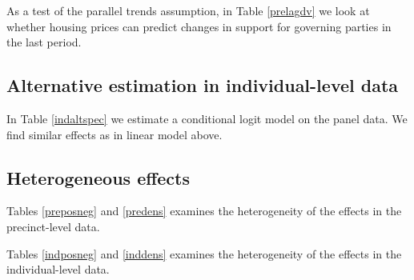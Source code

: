 \documentclass[12pt,a4paper]{article}
\begin{document}
	As a test of the parallel trends assumption, in Table \ref{prelagdv} we look at whether housing prices can predict changes in support for governing parties in the last period.
	
	
	
	
	\newpage
	
	\subsection{Alternative estimation in individual-level data}
	In Table \ref{indaltspec} we estimate a conditional logit model on the panel data. We find similar effects as in linear model above.
	
	
	
	\newpage
	
	\subsection{Heterogeneous effects}
	\setcounter{table}{0}
	
	Tables \ref{preposneg} and \ref{predens} examines the heterogeneity of the effects in the precinct-level data.
	
	
	
	
	
	
	Tables \ref{indposneg} and \ref{inddens} examines the heterogeneity of the effects in the individual-level data.
	
	
	
	
\end{document}

